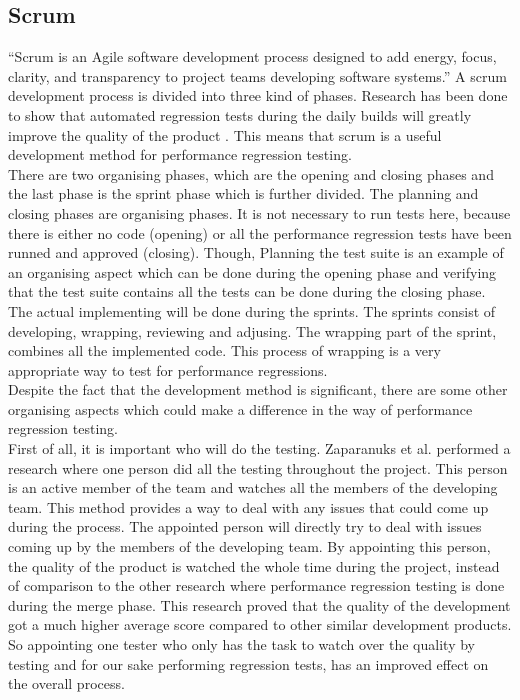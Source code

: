 \subsection{Scrum} 
``Scrum is an Agile software development process designed to add energy, focus, clarity, and transparency to project teams developing software systems.''\cite{sutherland2007distributed} A scrum development process is divided into three kind of phases. Research has been done to show that automated regression tests during the daily builds will greatly improve the quality of the product \cite{Future_of_Scrum}. This means that scrum is a useful development method for performance regression testing. \\ There are two organising phases, which are the opening and closing phases and the last phase is the sprint phase which is further divided. The planning and closing phases are organising phases. It is not necessary to run tests here, because there is either no code (opening) or all the performance regression tests have been runned and approved (closing). Though, Planning the test suite is an example of an organising aspect which can be done during the opening phase and verifying that the test suite contains all the tests can be done during the closing phase. \\ The actual implementing will be done during the sprints. The sprints consist of developing, wrapping, reviewing and adjusing. The wrapping part of the sprint, combines all the implemented code. This process of wrapping is a very appropriate way to test for performance regressions. \\

Despite the fact that the development method is significant, there are some other organising aspects which could make a difference in the way of performance regression testing. \\
First of all, it is important who will do the testing. Zaparanuks et al. performed a research where one person did all the testing throughout the project. \cite{sutherland2009fully} This person is an active member of the team and watches all the members of the developing team. This method provides a way to deal with any issues that could come up during the process. The appointed person will directly try to deal with issues coming up by the members of the developing team. By appointing this person, the quality of the product is watched the whole time during the project, instead of comparison to the other research where performance regression testing is done during the merge phase. This research proved that the quality of the development got a much higher average score compared to other similar development products. So appointing one tester who only has the task to watch over the quality by testing and for our sake performing regression tests, has an improved effect on the overall process. \\

